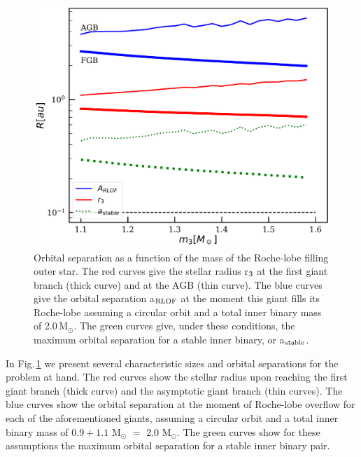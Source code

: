 \documentclass{aastex62}
\newcommand{\MSun}{\mbox{M$_\odot$}}
\begin{document}
{%
\begin{figure}[ht!]
  \includegraphics[width=\columnwidth]{fig_minimumstablesize.pdf}
\caption{Orbital separation as a function of the mass of the
  Roche-lobe filling outer star. The red curves give the stellar radius r$_{\rm 3}$ at the
  first giant branch (thick curve) and at the AGB (thin curve). The
  blue curves give the orbital separation a$_{\rm RLOF}$ at the moment this giant fills its
  Roche-lobe assuming a circular orbit and a total inner binary mass
  of 2.0\,\MSun. The green curves give, under these conditions, the
  maximum orbital separation for a stable inner binary, or a$_{\rm stable}$.
\label{fig:tertiarymass_vs_size}}
\end{figure}

In Fig.\,\ref{fig:tertiarymass_vs_size} we present several characteristic sizes and orbital separations for the problem at hand.  
The red curves show the stellar radius upon reaching the first giant branch (thick curve) and the asymptotic 
giant branch (thin curves).  The blue curves show the orbital separation at the moment of Roche-lobe overflow for each of the aforementioned giants, 
assuming a circular orbit and a total inner binary mass of $0.9 + 1.1$ M$_{\odot}$ $=$ 2.0 M$_{\odot}$.  The green curves show 
for these assumptions the maximum orbital separation for a stable inner binary pair.    

}
\end{document}
